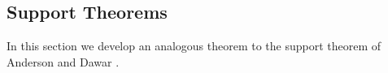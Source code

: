 \documentclass[../paper.tex]{subfiles}
\begin{document}




\subsection{Support Theorems}
In this section we develop an analogous theorem to the support theorem of
Anderson and Dawar \cite{AndersonD17}.
\end{document}
